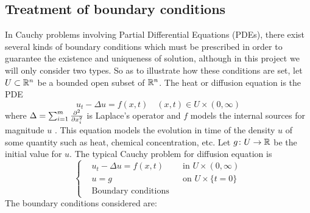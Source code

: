 \subsection{Treatment of boundary conditions}

In Cauchy problems involving Partial Differential Equations (PDEs), there exist
several kinds of boundary conditions which must be prescribed in order to
guarantee the existence and uniqueness of solution, although in this project
we will only consider two types. So as to illustrate how these conditions are set,
let $U \subset \mathbb{R}^n$ be a bounded open subset of $\mathbb{R}^n$. The heat or diffusion
equation is the PDE
\begin{equation} \label{eq:boundary_conditions_heat_equation}
	u_t - \Delta u = f(x, t) \quad (x, t) \in U \times (0,\infty)
\end{equation}
where $\Delta = \sum_{i=1}^{m} \pdv[2]{}{x_i}$ is Laplace's operator and $f$
models the internal sources for magnitude $u$ \cite{evans1998pde}. This equation models the
evolution in time of the density $u$ of some quantity such as heat, chemical
concentration, etc. Let $g \colon U \rightarrow \mathbb{R}$ be the
initial value for $u$. The typical Cauchy problem for diffusion equation is
\begin{equation} \label{eq:boundary_conditions_problem}
	\left\{
	\begin{aligned}
		&u_t - \Delta u = f(x, t) & &\text{in } U \times (0,\infty) \\
		&u = g & &\text{on } U \times \{ t = 0 \} \\
		&\text{Boundary conditions}
	\end{aligned}
	\right.
\end{equation}
The boundary conditions considered are:
